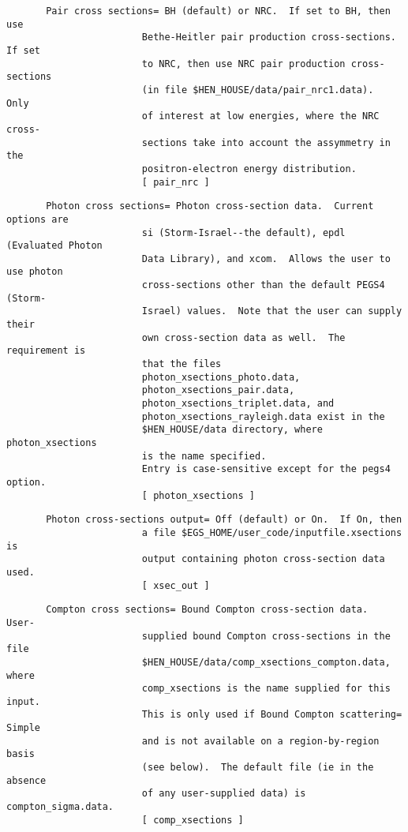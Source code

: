 \begin{verbatim}
       Pair cross sections= BH (default) or NRC.  If set to BH, then use
                        Bethe-Heitler pair production cross-sections.  If set
                        to NRC, then use NRC pair production cross-sections
                        (in file $HEN_HOUSE/data/pair_nrc1.data).  Only
                        of interest at low energies, where the NRC cross-
                        sections take into account the assymmetry in the
                        positron-electron energy distribution.
                        [ pair_nrc ]
\end{verbatim}
\begin{verbatim}
       Photon cross sections= Photon cross-section data.  Current options are
                        si (Storm-Israel--the default), epdl (Evaluated Photon
                        Data Library), and xcom.  Allows the user to use photon
                        cross-sections other than the default PEGS4 (Storm-
                        Israel) values.  Note that the user can supply their
                        own cross-section data as well.  The requirement is
                        that the files
                        photon_xsections_photo.data,
                        photon_xsections_pair.data,
                        photon_xsections_triplet.data, and
                        photon_xsections_rayleigh.data exist in the
                        $HEN_HOUSE/data directory, where photon_xsections
                        is the name specified.
                        Entry is case-sensitive except for the pegs4 option.
                        [ photon_xsections ]
\end{verbatim}
\begin{verbatim}
       Photon cross-sections output= Off (default) or On.  If On, then
                        a file $EGS_HOME/user_code/inputfile.xsections is
                        output containing photon cross-section data used.
                        [ xsec_out ]
\end{verbatim}
\begin{verbatim}
       Compton cross sections= Bound Compton cross-section data.  User-
                        supplied bound Compton cross-sections in the file
                        $HEN_HOUSE/data/comp_xsections_compton.data, where
                        comp_xsections is the name supplied for this input.
                        This is only used if Bound Compton scattering= Simple
                        and is not available on a region-by-region basis
                        (see below).  The default file (ie in the absence
                        of any user-supplied data) is compton_sigma.data.
                        [ comp_xsections ]
\end{verbatim}
